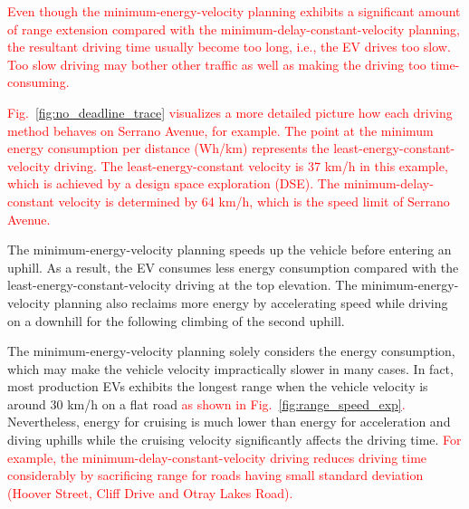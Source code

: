 \documentclass{IEEEtran}
\begin{document}
\textcolor{red}{Even though the minimum-energy-velocity planning exhibits a significant amount of range extension compared with the minimum-delay-constant-velocity planning, the resultant driving time usually become too long, i.e., the EV drives too slow. Too slow driving may bother other traffic as well as making the driving too time-consuming.}


\textcolor{red}{
Fig.~\ref{fig:no_deadline_trace} visualizes a more detailed picture how each driving method behaves on Serrano Avenue, for example. 
The point at the minimum energy consumption per distance (Wh/km) represents the least-energy-constant-velocity driving. The least-energy-constant velocity is 37 km/h in this example, which is achieved by a design space exploration (DSE). The minimum-delay-constant velocity is determined by 64 km/h, which is the speed limit of Serrano Avenue.}

The minimum-energy-velocity planning speeds up the vehicle before entering an uphill. As a result, the EV consumes less energy consumption compared with the least-energy-constant-velocity driving at the top elevation. The minimum-energy-velocity planning also reclaims more energy by accelerating speed while driving on a downhill for the following climbing of the second uphill. 

The minimum-energy-velocity planning solely considers the energy consumption, which may make the vehicle velocity impractically slower in many cases. In fact, most production EVs exhibits the longest range when the vehicle velocity is around 30 km/h on a flat road \textcolor{red}{as shown in Fig.~\ref{fig:range_speed_exp}.} Nevertheless, energy for cruising is much lower than energy for acceleration and diving uphills while the cruising velocity significantly affects the driving time. \textcolor{red}{For example, the minimum-delay-constant-velocity driving reduces driving time considerably by sacrificing range for roads having small standard deviation (Hoover Street, Cliff Drive and Otray Lakes Road).}\\


\end{document}

